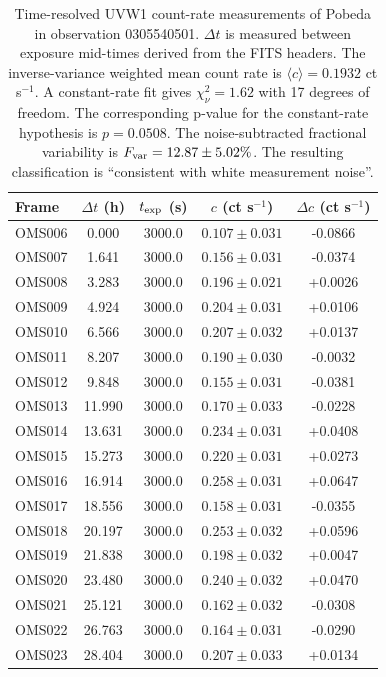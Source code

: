\begin{table}[t]
\centering
\small
\setlength{\tabcolsep}{3pt}
\renewcommand{\arraystretch}{1.03}
\begin{tabular}{lcccc}
\toprule
Frame & $\Delta t$ (h) & $t_{\rm exp}$ (s) & $c$ (ct s$^{-1}$) & $\Delta c$ (ct s$^{-1}$) \\
\midrule
OMS006 & 0.000 & 3000.0 & $0.107 \pm 0.031$ & -0.0866 \\
OMS007 & 1.641 & 3000.0 & $0.156 \pm 0.031$ & -0.0374 \\
OMS008 & 3.283 & 3000.0 & $0.196 \pm 0.021$ & +0.0026 \\
OMS009 & 4.924 & 3000.0 & $0.204 \pm 0.031$ & +0.0106 \\
OMS010 & 6.566 & 3000.0 & $0.207 \pm 0.032$ & +0.0137 \\
OMS011 & 8.207 & 3000.0 & $0.190 \pm 0.030$ & -0.0032 \\
OMS012 & 9.848 & 3000.0 & $0.155 \pm 0.031$ & -0.0381 \\
OMS013 & 11.990 & 3000.0 & $0.170 \pm 0.033$ & -0.0228 \\
OMS014 & 13.631 & 3000.0 & $0.234 \pm 0.031$ & +0.0408 \\
OMS015 & 15.273 & 3000.0 & $0.220 \pm 0.031$ & +0.0273 \\
OMS016 & 16.914 & 3000.0 & $0.258 \pm 0.031$ & +0.0647 \\
OMS017 & 18.556 & 3000.0 & $0.158 \pm 0.031$ & -0.0355 \\
OMS018 & 20.197 & 3000.0 & $0.253 \pm 0.032$ & +0.0596 \\
OMS019 & 21.838 & 3000.0 & $0.198 \pm 0.032$ & +0.0047 \\
OMS020 & 23.480 & 3000.0 & $0.240 \pm 0.032$ & +0.0470 \\
OMS021 & 25.121 & 3000.0 & $0.162 \pm 0.032$ & -0.0308 \\
OMS022 & 26.763 & 3000.0 & $0.164 \pm 0.031$ & -0.0290 \\
OMS023 & 28.404 & 3000.0 & $0.207 \pm 0.033$ & +0.0134 \\
\bottomrule
\end{tabular}
\caption{Time-resolved UVW1 count-rate measurements of Pobeda in observation 0305540501. $\Delta t$ is measured between exposure mid-times derived from the FITS headers. The inverse-variance weighted mean count rate is $\langle c\rangle=0.1932$ ct s$^{-1}$. A constant-rate fit gives $\chi^2_\nu=1.62$ with 17 degrees of freedom. The corresponding p-value for the constant-rate hypothesis is $p=0.0508$. The noise-subtracted fractional variability is $F_{\rm var}=12.87\pm5.02\%$. The resulting classification is ``consistent with white measurement noise''.}
\label{tab:pobeda-time-series}
\end{table}
